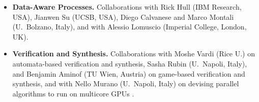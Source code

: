 \begin{itemize}
\item \textbf{Data-Aware Processes.}  
Collaborations with Rick Hull
(IBM Research, USA), Jianwen Su (UCSB, USA), Diego Calvanese and Marco
Montali (U.\ Bolzano, Italy), and with Alessio Lomuscio (Imperial
College, London, UK).

\item \textbf{Verification and Synthesis.}
Collaborations with Moshe Vardi (Rice U.)
on automata-based verification and synthesis, Sasha Rubin (U.\ Napoli,
Italy), and Benjamin Aminof (TU Wien, Austria) on game-based
verification and synthesis, and with Nello Murano (U.\ Napoli, Italy)
on devising parallel algorithms to run on multicore GPUs \cite{ArcucciMMS17,ArcucciMPS17}.


\end{itemize}
